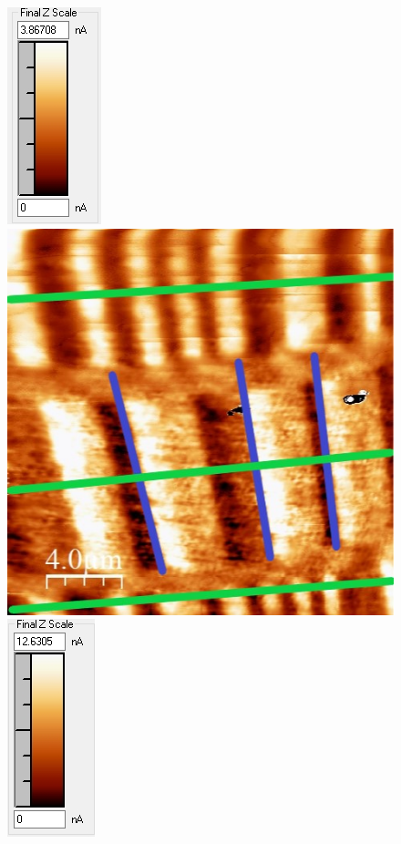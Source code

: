 \documentclass[%
 reprint,
amsmath,amssymb,
pra,
]{revtex4-1}
\begin{document}
\begin{figure}
\centering
\includegraphics[scale=0.7]{Bilder/Magnetic/try2_scale.jpg}
\includegraphics[scale=0.45]{Bilder/Magnetic/try2_lines.jpg}
\includegraphics[scale=0.7]{Bilder/Magnetic/try4_scale.jpg}

\end{figure}
\end{document}
